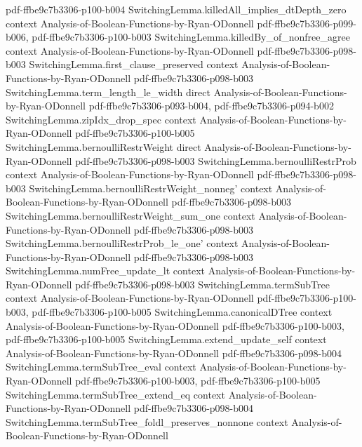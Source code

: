 \begin{theorem}
{    pdf-ffbe9c7b3306-p100-b004}
\proofstep
  {SwitchingLemma.killedAll_implies_dtDepth_zero}
  {context}
  {Analysis-of-Boolean-Functions-by-Ryan-ODonnell}
  {pdf-ffbe9c7b3306-p099-b006,
    pdf-ffbe9c7b3306-p100-b003}
\proofstep
  {SwitchingLemma.killedBy_of_nonfree_agree}
  {context}
  {Analysis-of-Boolean-Functions-by-Ryan-ODonnell}
  {pdf-ffbe9c7b3306-p098-b003}
\proofstep
  {SwitchingLemma.first_clause_preserved}
  {context}
  {Analysis-of-Boolean-Functions-by-Ryan-ODonnell}
  {pdf-ffbe9c7b3306-p098-b003}
\proofstep
  {SwitchingLemma.term_length_le_width}
  {direct}
  {Analysis-of-Boolean-Functions-by-Ryan-ODonnell}
  {pdf-ffbe9c7b3306-p093-b004,
    pdf-ffbe9c7b3306-p094-b002}
\proofstep
  {SwitchingLemma.zipIdx_drop_spec}
  {context}
  {Analysis-of-Boolean-Functions-by-Ryan-ODonnell}
  {pdf-ffbe9c7b3306-p100-b005}
\proofstep
  {SwitchingLemma.bernoulliRestrWeight}
  {direct}
  {Analysis-of-Boolean-Functions-by-Ryan-ODonnell}
  {pdf-ffbe9c7b3306-p098-b003}
\proofstep
  {SwitchingLemma.bernoulliRestrProb}
  {context}
  {Analysis-of-Boolean-Functions-by-Ryan-ODonnell}
  {pdf-ffbe9c7b3306-p098-b003}
\proofstep
  {SwitchingLemma.bernoulliRestrWeight_nonneg'}
  {context}
  {Analysis-of-Boolean-Functions-by-Ryan-ODonnell}
  {pdf-ffbe9c7b3306-p098-b003}
\proofstep
  {SwitchingLemma.bernoulliRestrWeight_sum_one}
  {context}
  {Analysis-of-Boolean-Functions-by-Ryan-ODonnell}
  {pdf-ffbe9c7b3306-p098-b003}
\proofstep
  {SwitchingLemma.bernoulliRestrProb_le_one'}
  {context}
  {Analysis-of-Boolean-Functions-by-Ryan-ODonnell}
  {pdf-ffbe9c7b3306-p098-b003}
\proofstep
  {SwitchingLemma.numFree_update_lt}
  {context}
  {Analysis-of-Boolean-Functions-by-Ryan-ODonnell}
  {pdf-ffbe9c7b3306-p098-b003}
\proofstep
  {SwitchingLemma.termSubTree}
  {context}
  {Analysis-of-Boolean-Functions-by-Ryan-ODonnell}
  {pdf-ffbe9c7b3306-p100-b003,
    pdf-ffbe9c7b3306-p100-b005}
\proofstep
  {SwitchingLemma.canonicalDTree}
  {context}
  {Analysis-of-Boolean-Functions-by-Ryan-ODonnell}
  {pdf-ffbe9c7b3306-p100-b003,
    pdf-ffbe9c7b3306-p100-b005}
\proofstep
  {SwitchingLemma.extend_update_self}
  {context}
  {Analysis-of-Boolean-Functions-by-Ryan-ODonnell}
  {pdf-ffbe9c7b3306-p098-b004}
\proofstep
  {SwitchingLemma.termSubTree_eval}
  {context}
  {Analysis-of-Boolean-Functions-by-Ryan-ODonnell}
  {pdf-ffbe9c7b3306-p100-b003,
    pdf-ffbe9c7b3306-p100-b005}
\proofstep
  {SwitchingLemma.termSubTree_extend_eq}
  {context}
  {Analysis-of-Boolean-Functions-by-Ryan-ODonnell}
  {pdf-ffbe9c7b3306-p098-b004}
\proofstep
  {SwitchingLemma.termSubTree_foldl_preserves_nonnone}
  {context}
  {Analysis-of-Boolean-Functions-by-Ryan-ODonnell}

\end{theorem}
